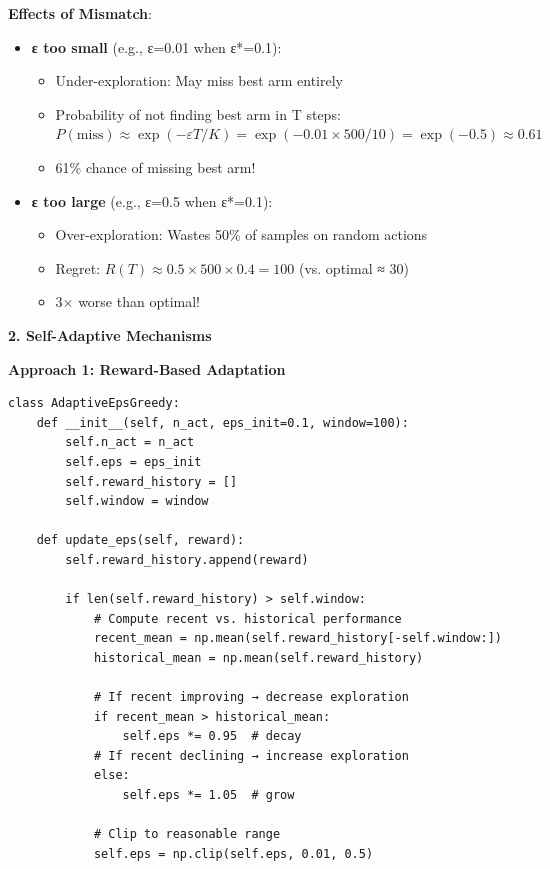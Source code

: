\documentclass[12pt]{article}
\begin{document}
{{{\textbf{Effects of Mismatch}:
\begin{itemize}
\item \textbf{ε too small} (e.g., ε=0.01 when ε*=0.1):
  \begin{itemize}
  \item Under-exploration: May miss best arm entirely
  \item Probability of not finding best arm in T steps: $P(\text{miss}) \approx \exp(-\varepsilon T / K) = \exp(-0.01 \times 500 / 10) = \exp(-0.5) \approx 0.61$
  \item 61\% chance of missing best arm!
  \end{itemize}
\item \textbf{ε too large} (e.g., ε=0.5 when ε*=0.1):
  \begin{itemize}
  \item Over-exploration: Wastes 50\% of samples on random actions
  \item Regret: $R(T) \approx 0.5 \times 500 \times 0.4 = 100$ (vs. optimal ≈ 30)
  \item 3× worse than optimal!
  \end{itemize}
\end{itemize}

\textbf{2. Self-Adaptive Mechanisms}

\textbf{Approach 1: Reward-Based Adaptation}

\begin{verbatim}
class AdaptiveEpsGreedy:
    def __init__(self, n_act, eps_init=0.1, window=100):
        self.n_act = n_act
        self.eps = eps_init
        self.reward_history = []
        self.window = window

    def update_eps(self, reward):
        self.reward_history.append(reward)

        if len(self.reward_history) > self.window:
            # Compute recent vs. historical performance
            recent_mean = np.mean(self.reward_history[-self.window:])
            historical_mean = np.mean(self.reward_history)

            # If recent improving → decrease exploration
            if recent_mean > historical_mean:
                self.eps *= 0.95  # decay
            # If recent declining → increase exploration
            else:
                self.eps *= 1.05  # grow

            # Clip to reasonable range
            self.eps = np.clip(self.eps, 0.01, 0.5)
\end{verbatim}

}}}
\end{document}
